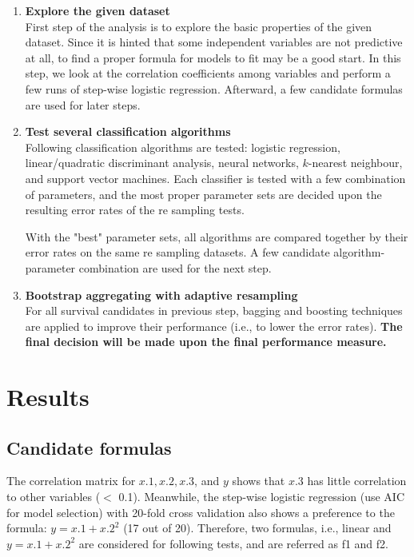 \documentclass[a4paper,12pt]{article}
\begin{document}
\begin{enumerate}
\item {\bf Explore the given dataset}\\
First step of the analysis is to explore the basic properties of the given dataset.  Since it is hinted that some independent variables are not predictive at all, to find a proper formula for models to fit may be a good start.  In this step, we look at the correlation coefficients among variables and perform a few runs of step-wise logistic regression.  Afterward, a few candidate formulas are used for later steps.

\item {\bf Test several classification algorithms} \\ 
  Following classification algorithms are tested: logistic regression, linear/quadratic discriminant analysis, neural networks, $k$-nearest neighbour, and support vector machines.  Each classifier is tested with a few combination of parameters, and the most proper parameter sets are decided upon the resulting error rates of the re sampling tests.

  With the "best" parameter sets, all algorithms are compared together by their error rates on the same re sampling datasets.  A few candidate algorithm-parameter combination are used for the next step.

\item {\bf Bootstrap aggregating with adaptive resampling}\\
For all survival candidates in previous step, bagging and boosting techniques are applied to improve their performance (i.e., to lower the error rates).  {\bf The final decision will be made upon the final performance measure.}

\end{enumerate}


\section{Results}
\pagebreak
\subsection*{\bf Candidate formulas}
The correlation matrix for $x.1, x.2, x.3$, and $y$ shows that $x.3$ has little correlation to other variables ($<$ 0.1). Meanwhile, the step-wise logistic regression (use AIC for model selection) with 20-fold cross validation also shows a preference to the formula: $y = x.1 + x.2^2$ (17 out of 20).  Therefore, two formulas, i.e., linear and $y = x.1 + x.2^2$ are considered for following tests, and are referred as f1 and f2.
\end{document}

